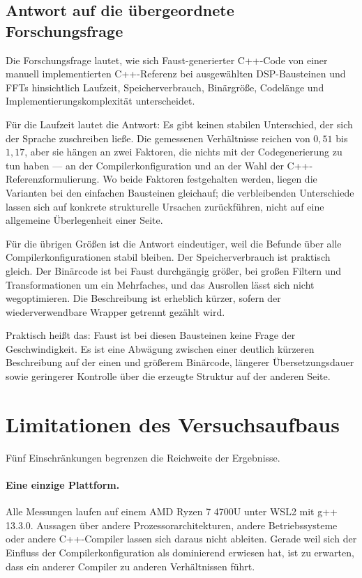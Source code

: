 \subsection{Antwort auf die übergeordnete Forschungsfrage}

Die Forschungsfrage lautet, wie sich Faust-generierter C++-Code von einer manuell implementierten C++-Referenz bei ausgewählten DSP-Bausteinen und FFTs hinsichtlich Laufzeit, Speicherverbrauch, Binärgröße, Codelänge und Implementierungskomplexität unterscheidet.

Für die Laufzeit lautet die Antwort: Es gibt keinen stabilen Unterschied, der sich der Sprache zuschreiben ließe. Die gemessenen Verhältnisse reichen von $0{,}51$ bis $1{,}17$, aber sie hängen an zwei Faktoren, die nichts mit der Codegenerierung zu tun haben --- an der Compilerkonfiguration und an der Wahl der C++-Referenzformulierung. Wo beide Faktoren festgehalten werden, liegen die Varianten bei den einfachen Bausteinen gleichauf; die verbleibenden Unterschiede lassen sich auf konkrete strukturelle Ursachen zurückführen, nicht auf eine allgemeine Überlegenheit einer Seite.

Für die übrigen Größen ist die Antwort eindeutiger, weil die Befunde über alle Compilerkonfigurationen stabil bleiben. Der Speicherverbrauch ist praktisch gleich. Der Binärcode ist bei Faust durchgängig größer, bei großen Filtern und Transformationen um ein Mehrfaches, und das Ausrollen lässt sich nicht wegoptimieren. Die Beschreibung ist erheblich kürzer, sofern der wiederverwendbare Wrapper getrennt gezählt wird.

Praktisch heißt das: Faust ist bei diesen Bausteinen keine Frage der Geschwindigkeit. Es ist eine Abwägung zwischen einer deutlich kürzeren Beschreibung auf der einen und größerem Binärcode, längerer Übersetzungsdauer sowie geringerer Kontrolle über die erzeugte Struktur auf der anderen Seite.

\section{Limitationen des Versuchsaufbaus}
\label{sec:limitationen}

Fünf Einschränkungen begrenzen die Reichweite der Ergebnisse.

\paragraph{Eine einzige Plattform.}
Alle Messungen laufen auf einem AMD Ryzen 7 4700U unter WSL2 mit g++ 13.3.0. Aussagen über andere Prozessorarchitekturen, andere Betriebssysteme oder andere C++-Compiler lassen sich daraus nicht ableiten. Gerade weil sich der Einfluss der Compilerkonfiguration als dominierend erwiesen hat, ist zu erwarten, dass ein anderer Compiler zu anderen Verhältnissen führt.

